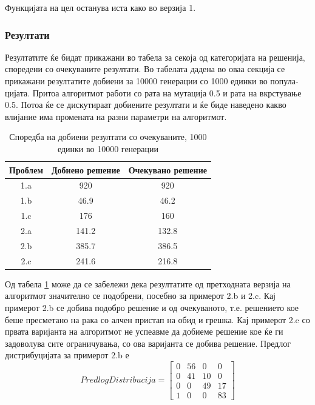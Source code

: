 \documentclass{article}
\begin{document}
Функцијата на цел останува иста како во верзија 1.

\subsubsection{Резултати}
 
Резултатите ќе бидат прикажани во табела за секоја од категоријата на решенија, споредени со очекуваните резултати. Во табелата дадена во оваа секција се прикажани резултатите добиени за 10000 генерации со 1000 единки во попула-цијата. Притоа алгоритмот работи со рата на мутација 0.5 и рата на вкрстување 0.5. Потоа ќе се дискутираат добиените резултати и ќе биде наведено какво влијание има промената на разни параметри на алгоритмот. 

\begin{table}[h!]
\centering
\begin{tabular}{||c c c||} 
 \hline
 Проблем & Добиено решение & Очекувано решение \\ [0.5ex]
 \hline\hline
 1.a & 920 & 920\\ 
 1.b & 46.9 & 46.2 \\
 1.c & 176 & 160 \\
 2.a & 141.2 & 132.8 \\
 2.b & 385.7 & 386.5 \\
 2.c & 241.6 & 216.8 \\ [1ex] 
 \hline
\end{tabular}
\caption{Споредба на добиени резултати со очекуваните, 1000 единки во 10000 генерации}
\label{table_rez_ver2}
\end{table}

Од табела \ref{table_rez_ver2} може да се забележи дека резултатите од претходната верзија на алгоритмот значително се подобрени, посебно за примерот 2.b и 2.c. Кај примерот 2.b се добива подобро решение и од очекуваното, т.е. решението кое беше пресметано на рака со алчен пристап на обид и грешка. Кај примерот 2.c со првата варијанта на алгоритмот не успеавме да добиеме решение кое ќе ги задоволува сите ограничувања, со ова варијанта се добива решение. Предлог дистрибуцијата за примерот 2.b е 
\[PredlogDistribucija = \begin{bmatrix} 0 & 56 & 0 & 0 \\ 0 & 41 & 10 & 0 \\ 0 & 0 & 49 & 17 \\ 1 & 0 & 0 & 83 \end{bmatrix}\]
\end{document}

